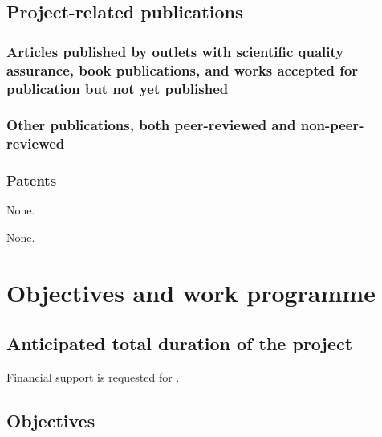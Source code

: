\documentclass{scrartcl}
\begin{document}
\lipsum[1]


\subsection{Project-related publications}

\subsubsection{Articles published by outlets with scientific quality assurance, book publications, and works accepted for publication but not yet published}
\printbibliography[category=reviewed, heading=none]

\subsubsection{Other publications, both peer-reviewed and non-peer-reviewed}
\printbibliography[category=nonreviewed, heading=none]

\subsubsection{Patents}

\printbibliography[category=patents_pending, heading=none]
None.

\printbibliography[category=patents, heading=none]
None.

\section{Objectives and work programme}

\subsection{Anticipated total duration of the project}
Financial support is requested for .

\subsection{Objectives}
\let\oldpara=\theparagraph
\addtocounter{secnumdepth}{1}
\renewcommand{\theparagraph}{Goal \arabic{paragraph}}
\end{document}
